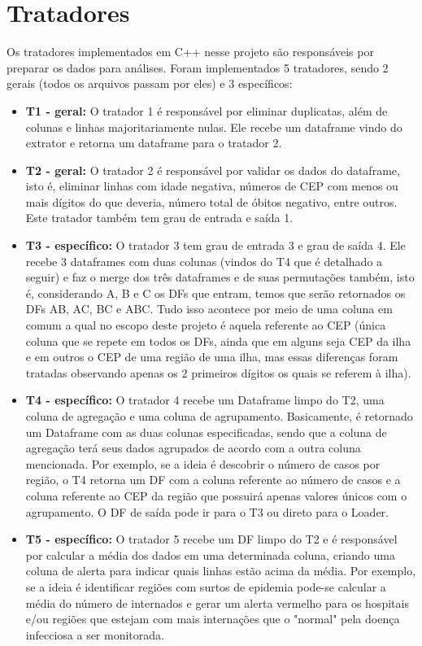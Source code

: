 \documentclass[a4paper,12pt]{article}
\begin{document}
\section{Tratadores}

Os tratadores implementados em C++ nesse projeto são responsáveis por preparar os dados para análises. Foram implementados 5 tratadores, sendo 2 gerais (todos os arquivos passam por eles) e 3 específicos:

\begin{itemize}
    \item \textbf{T1 - geral:} O tratador 1 é responsável por eliminar duplicatas, além de colunas e linhas majoritariamente nulas. Ele recebe um dataframe vindo do extrator e retorna um dataframe para o tratador 2.

    \item \textbf{T2 - geral:} O tratador 2 é responsável por validar os dados do dataframe, isto é, eliminar linhas com idade negativa, números de CEP com menos ou mais dígitos do que deveria, número total de óbitos negativo, entre outros. Este tratador também tem grau de entrada e saída 1.
    
    \item \textbf{T3 - específico:} O tratador 3 tem grau de entrada 3 e grau de saída 4. Ele recebe 3 dataframes com duas colunas (vindos do T4 que é detalhado a seguir) e faz o merge dos três dataframes e de suas permutações também, isto é, considerando A, B e C os DFs que entram, temos que serão retornados os DFs AB, AC, BC e ABC. Tudo isso acontece por meio de uma coluna em comum a qual no escopo deste projeto é aquela referente ao CEP (única coluna que se repete em todos os DFs, ainda que em alguns seja CEP da ilha e em outros o CEP de uma região de uma ilha, mas essas diferenças foram tratadas observando apenas os 2 primeiros dígitos os quais se referem à ilha).
    
    \item \textbf{T4 - específico:} O tratador 4 recebe um Dataframe limpo do T2, uma coluna de agregação e uma coluna de agrupamento. Basicamente, é retornado um Dataframe com as duas colunas especificadas, sendo que a coluna de agregação terá seus dados agrupados de acordo com a outra coluna mencionada. Por exemplo, se a ideia é descobrir o número de casos por região, o T4 retorna um DF com a coluna referente ao número de casos e a coluna referente ao CEP da região que possuirá apenas valores únicos com o agrupamento. O DF de saída pode ir para o T3 ou direto para o Loader.
    
    \item \textbf{T5 - específico:} O tratador 5 recebe um DF limpo do T2 e é responsável por calcular a média dos dados em uma determinada coluna, criando uma coluna de alerta para indicar quais linhas estão acima da média. Por exemplo, se a ideia é identificar regiões com surtos de epidemia pode-se calcular a média do número de internados e gerar um alerta vermelho para os hospitais e/ou regiões que estejam com mais internações que o "normal" pela doença infecciosa a ser monitorada.
    
\end{itemize}
\end{document}
